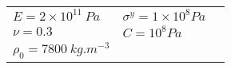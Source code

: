   \begin{tabular}{l|lN}
    \hline
    $E=2\times 10^{11}\:Pa$ & $\sigma^y=1 \times 10^8 Pa$ & \\ [3pt]
    $\nu=0.3$ & $C=10^{8} Pa$  &\\[3pt]
    $\rho_0 = 7800 \: kg.m^{-3}$ & &\\[3pt]
    \hline
  \end{tabular}

